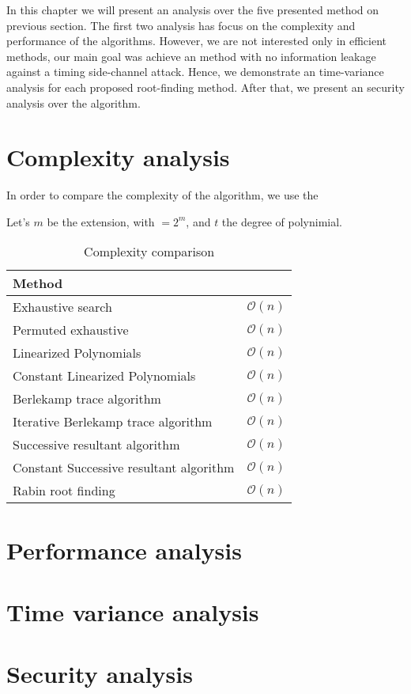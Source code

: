 In this chapter we will present an analysis over the five presented method on previous section. The first two analysis has focus on the complexity and performance of the algorithms. However, we are not interested only in efficient methods, our main goal was achieve an method with no information leakage against a timing side-channel attack. Hence, we demonstrate an time-variance analysis for each proposed root-finding method. After that, we present an security analysis over the algorithm.

\section{Complexity analysis}
In order to compare the complexity of the algorithm, we use the 

Let's $m$ be the extension, with $ = 2^m$, and $t$ the degree of polynimial.


\begin{table}[ht]
\centering
\label{tab:complexity}
\caption{Complexity comparison}
\begin{tabular}{ll}
Method                                  &                \\ \hline
Exhaustive search                       & $\mathcal{O}(n)$ \\
Permuted exhaustive                     & $\mathcal{O}(n)$ \\
Linearized Polynomials                  & $\mathcal{O}(n)$ \\
Constant Linearized Polynomials         & $\mathcal{O}(n)$ \\
Berlekamp trace algorithm               & $\mathcal{O}(n)$ \\
Iterative Berlekamp trace algorithm     & $\mathcal{O}(n)$ \\
Successive resultant algorithm          & $\mathcal{O}(n)$ \\
Constant Successive resultant algorithm & $\mathcal{O}(n)$ \\
Rabin root finding                      & $\mathcal{O}(n)$
\end{tabular}
\end{table}



\section{Performance analysis}
\section{Time variance analysis}
\section{Security analysis}